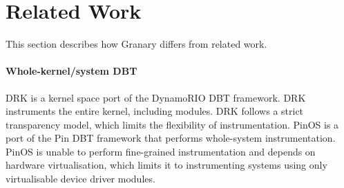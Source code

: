 \documentclass[preprint]{sigplanconf}
\begin{document}




\section{Related Work}\label{sec:related}
This section describes how Granary differs from related work.

\paragraph{Whole-kernel/system DBT} DRK \cite{DRK} is a kernel space port of the DynamoRIO \cite{DynamoRIO} DBT framework. DRK instruments the entire kernel, including modules. DRK follows a strict transparency model, which limits the flexibility of instrumentation. PinOS \cite{PinOS} is a port of the Pin \cite{Pin} DBT framework that performs whole-system instrumentation. PinOS is unable to perform fine-grained instrumentation and depends on hardware virtualisation, which limits it to instrumenting systems using only virtualisable device driver modules.
\end{document}
